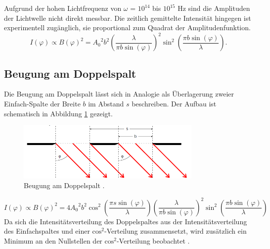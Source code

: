 \noindent
Aufgrund der hohen Lichtfrequenz von $\omega$ = $10^{14}$ bis $10^{15}$ Hz sind die Amplituden der Lichtwelle nicht direkt messbar.
 Die zeitlich gemittelte Intensität hingegen ist experimentell zugänglich, sie proportional zum Quadrat der Amplitudenfunktion. 
 \begin{equation}
I(\varphi) \propto B(\varphi)^2 = {A_0}^2 b^2 \left(
\frac{\lambda}{\pi b \sin (\varphi)} \right)^2 \sin^2 \left(
\frac{\pi b \sin (\varphi)}{\lambda} \right).
\end{equation}
\subsection{Beugung am Doppelspalt}
Die Beugung am Doppelspalt lässt sich in Analogie als Überlagerung zweier Einfach-Spalte der Breite $b$ im Abstand $s$ beschreiben. 
Der Aufbau ist schematisch in Abbildung \ref{fig:Doppelspalt} gezeigt.
\begin{figure}[H]
    \centering
    \includegraphics[width=0.8\textwidth]{Doppelspalt.png}
    \caption{Beugung am Doppelspalt \cite{1}.}
    \label{fig:Doppelspalt}
\end{figure}
\noindent
\begin{equation}
I(\varphi) \propto B(\varphi)^2 = 4 {A_0}^2 b^2 \cos^2 \left(
\frac{\pi s \sin (\varphi)}{\lambda} \right)  \left(
\frac{\lambda}{\pi b \sin (\varphi)} \right)^2 \sin^2 \left(
\frac{\pi b \sin (\varphi)}{\lambda} \right)
\end{equation}
Da sich die Intensitätsverteilung des Doppelspaltes aus der Intensitätsverteilung des Einfachspaltes und einer $\text{cos}^2$-Verteilung zusammensetzt,
  wird zusätzlich ein Minimum an den Nullstellen der $\text{cos}^2$-Verteilung beobachtet . 
